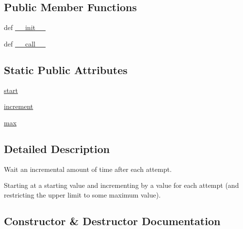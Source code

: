 \subsection*{Public Member Functions}
\begin{DoxyCompactItemize}
\item 
def \hyperlink{classpip_1_1__vendor_1_1tenacity_1_1wait_1_1wait__incrementing_a5e9e106cdffe6a21f34a006bcacbca5d}{\+\_\+\+\_\+init\+\_\+\+\_\+}
\item 
def \hyperlink{classpip_1_1__vendor_1_1tenacity_1_1wait_1_1wait__incrementing_a00cb4c3d47c3549885e61a995e6d0a77}{\+\_\+\+\_\+call\+\_\+\+\_\+}
\end{DoxyCompactItemize}
\subsection*{Static Public Attributes}
\begin{DoxyCompactItemize}
\item 
\hyperlink{classpip_1_1__vendor_1_1tenacity_1_1wait_1_1wait__incrementing_a0372d8b01ef2ee6f3f48fd2424d96abc}{start}
\item 
\hyperlink{classpip_1_1__vendor_1_1tenacity_1_1wait_1_1wait__incrementing_a9ca7a8f9ae5adce58dee725c2f93047b}{increment}
\item 
\hyperlink{classpip_1_1__vendor_1_1tenacity_1_1wait_1_1wait__incrementing_a0eea707c347c19ac4c7114bf61273e9a}{max}
\end{DoxyCompactItemize}


\subsection{Detailed Description}
\begin{DoxyVerb}Wait an incremental amount of time after each attempt.

Starting at a starting value and incrementing by a value for each attempt
(and restricting the upper limit to some maximum value).
\end{DoxyVerb}
 

\subsection{Constructor \& Destructor Documentation}
\mbox{\label{classpip_1_1__vendor_1_1tenacity_1_1wait_1_1wait__incrementing_a5e9e106cdffe6a21f34a006bcacbca5d}} 
